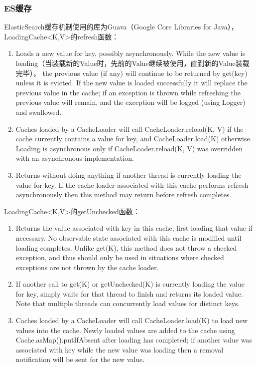 \subsubsection{ES缓存}
\par ElasticSearch缓存机制使用的库为Guava（Google Core Libraries for Java），LoadingCache<K,V>的refresh函数：
\begin{enumerate}[(1)]
\item Loads a new value for key, possibly asynchronously. While the new value is loading（当装载新的Value时，先前的Value继续被使用，直到新的Value装载完毕）， the previous value (if any) will continue to be returned by get(key) unless it is evicted. If the new value is loaded successfully it will replace the previous value in the cache; if an exception is thrown while refreshing the previous value will remain, and the exception will be logged (using Logger) and swallowed.
\item Caches loaded by a CacheLoader will call CacheLoader.reload(K, V) if the cache currently contains a value for key, and CacheLoader.load(K) otherwise. Loading is asynchronous only if CacheLoader.reload(K, V) was overridden with an asynchronous implementation. 
\item Returns without doing anything if another thread is currently loading the value for key. If the cache loader associated with this cache performs refresh asynchronously then this method may return before refresh completes.
\end{enumerate}
\par LoadingCache<K,V>的getUnchecked函数：
\begin{enumerate}[(1)]
\item Returns the value associated with key in this cache, first loading that value if necessary. No observable state associated with this cache is modified until loading completes. Unlike get(K), this method does not throw a checked exception, and thus should only be used in situations where checked exceptions are not thrown by the cache loader.
\item If another call to get(K) or getUnchecked(K) is currently loading the value for key, simply waits for that thread to finish and returns its loaded value. Note that multiple threads can concurrently load values for distinct keys.
\item Caches loaded by a CacheLoader will call CacheLoader.load(K) to load new values into the cache. Newly loaded values are added to the cache using Cache.asMap().putIfAbsent after loading has completed; if another value was associated with key while the new value was loading then a removal notification will be sent for the new value.
\end{enumerate}
